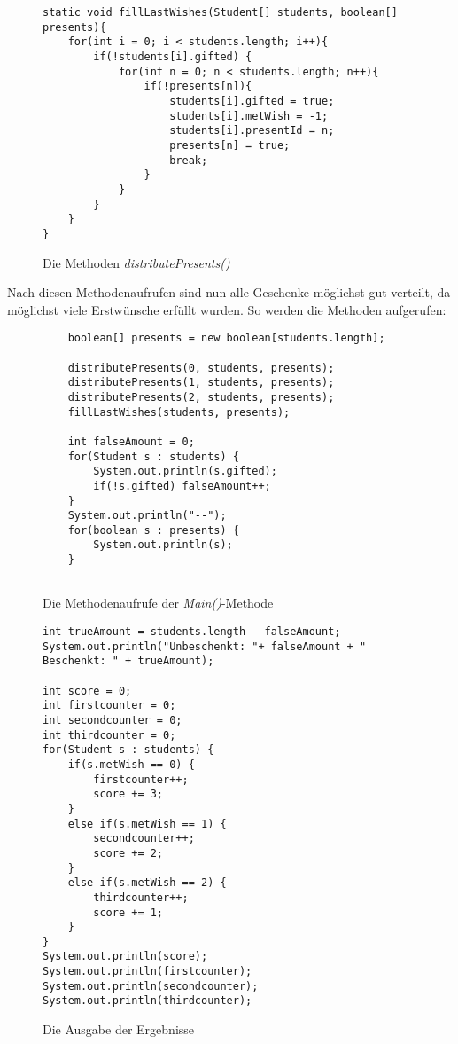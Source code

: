 \documentclass[a4paper, 12pt]{scrartcl}
\begin{document}
\begin{figure}[H]
\centering
\begin{lstlisting}
static void fillLastWishes(Student[] students, boolean[] presents){
    for(int i = 0; i < students.length; i++){
        if(!students[i].gifted) {
            for(int n = 0; n < students.length; n++){
                if(!presents[n]){
                    students[i].gifted = true;
                    students[i].metWish = -1;
                    students[i].presentId = n;
                    presents[n] = true;
                    break;
                }
            }
        }
    }
}
\end{lstlisting}
\caption{Die Methoden \emph{distributePresents()}}
\end{figure}

Nach diesen Methodenaufrufen sind nun alle Geschenke möglichst gut verteilt, da möglichst viele Erstwünsche erfüllt wurden.
So werden die Methoden aufgerufen:
\begin{figure}[H]
\centering
\begin{lstlisting}
    boolean[] presents = new boolean[students.length];
            
    distributePresents(0, students, presents);
    distributePresents(1, students, presents);
    distributePresents(2, students, presents);
    fillLastWishes(students, presents);
    
    int falseAmount = 0;
    for(Student s : students) {
        System.out.println(s.gifted);
        if(!s.gifted) falseAmount++;
    }
    System.out.println("--");
    for(boolean s : presents) {
        System.out.println(s);
    }
    
\end{lstlisting}
\caption{Die Methodenaufrufe der \emph{Main()}-Methode}
\end{figure}

\begin{figure}[H]
\centering
\begin{lstlisting}
int trueAmount = students.length - falseAmount;
System.out.println("Unbeschenkt: "+ falseAmount + "    Beschenkt: " + trueAmount);

int score = 0;
int firstcounter = 0;
int secondcounter = 0;
int thirdcounter = 0;
for(Student s : students) {
    if(s.metWish == 0) {
        firstcounter++;
        score += 3;
    }
    else if(s.metWish == 1) {
        secondcounter++;
        score += 2;
    }
    else if(s.metWish == 2) {
        thirdcounter++;
        score += 1;
    }
}
System.out.println(score);
System.out.println(firstcounter);
System.out.println(secondcounter);
System.out.println(thirdcounter);
\end{lstlisting}
\caption{Die Ausgabe der Ergebnisse}
\end{figure}
\end{document}
